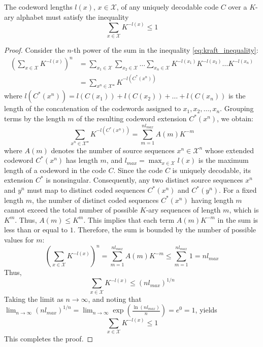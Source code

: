 \begin{theorem}\label{thm:kraft_inequality}
    The codeword lengths $l(x)$, $x \in \mathcal{X}$, of any uniquely decodable code $C$ over a $K$-ary alphabet must satisfy the inequality
    \begin{equation}\label{eq:kraft_inequality}
        \sum_{x\in\mathcal{X}} K^{-l(x)} \leq 1
    \end{equation}
\end{theorem}
\begin{proof}
    Consider the $n$-th power of the sum in the inequality \eqref{eq:kraft_inequality}:
    \begin{align*}
        \left( \sum_{x\in\mathcal{X}} K^{-l(x)} \right)^n & = \sum_{x_1\in\mathcal{X}} \sum_{x_2\in\mathcal{X}} \ldots \sum_{x_n\in\mathcal{X}} K^{-l(x_1)} K^{-l(x_2)} \ldots K^{-l(x_n)} \\
                                                          & = \sum_{x^n \in\mathcal{X^n}} K^{-l(C^*(x^n))}
    \end{align*}
    where $l(C^*(x^n)) = l(C(x_1)) + l(C(x_2)) + \ldots + l(C(x_n))$ is the length of the concatenation of the codewords assigned to $x_1, x_2, \ldots, x_n$. Grouping terms by the length $m$ of the resulting codeword extension $C^*(x^n)$, we obtain:
    \begin{equation*}
        \sum_{x^n \in\mathcal{X^n}} K^{-l(C^*(x^n))} = \sum_{m=1}^{n l_{max}} A(m) K^{-m}
    \end{equation*}
    where $A(m)$ denotes the number of source sequences $x^n \in \mathcal{X}^n$ whose extended codeword $C^*(x^n)$ has length $m$, and $l_{max} = \max_{x\in\mathcal{X}} l(x)$ is the maximum length of a codeword in the code $C$. Since the code $C$ is uniquely decodable, its extension $C^*$ is nonsingular. Consequently, any two distinct source sequences $x^n$ and $y^n$ must map to distinct coded sequences $C^*(x^n)$ and $C^*(y^n)$. For a fixed length $m$, the number of distinct coded sequences $C^*(x^n)$ having length $m$ cannot exceed the total number of possible $K$-ary sequences of length $m$, which is $K^m$. Thus, $A(m) \leq K^m$. This implies that each term $A(m)K^{-m}$ in the sum is less than or equal to $1$. Therefore, the sum is bounded by the number of possible values for $m$:
    \begin{equation*}
        \left( \sum_{x\in\mathcal{X}} K^{-l(x)} \right)^n = \sum_{m=1}^{n l_{max}} A(m) K^{-m} \leq \sum_{m=1}^{n l_{max}} 1 = n l_{max}
    \end{equation*}
    Thus,
    \begin{equation*}
        \sum_{x\in\mathcal{X}} K^{-l(x)} \leq (n l_{max})^{1/n}
    \end{equation*}
    Taking the limit as $n \to \infty$, and noting that $\lim_{n\to\infty} (n l_{max})^{1/n} = \lim_{n\to\infty} \exp\left(\frac{\ln(n l_{max})}{n}\right) = e^0 = 1$, yields
    \begin{equation*}
        \sum_{x\in\mathcal{X}} K^{-l(x)} \leq 1
    \end{equation*}
    This completes the proof.
\end{proof}
